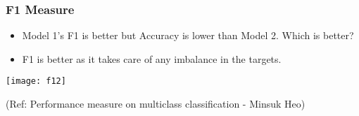 \begin{frame}[fragile]\frametitle{F1 Measure}
\begin{itemize}
\item Model 1's F1 is better but Accuracy is lower than Model 2. Which is better?
\item F1 is better as it takes care of any imbalance in the targets.
\end{itemize}

\begin{center}
\texttt{[image: f12]}
\end{center}

\tiny{(Ref: Performance measure on multiclass classification - Minsuk Heo)}


\end{frame}




